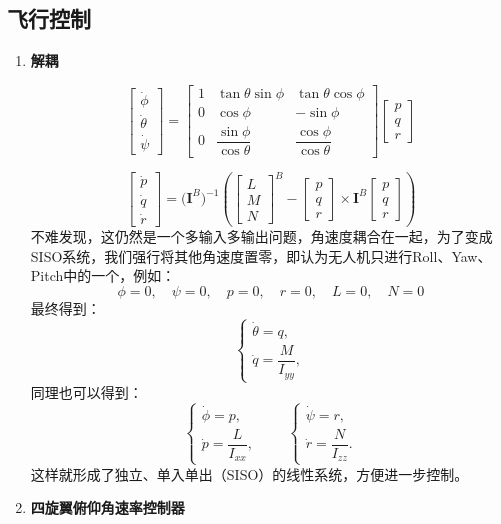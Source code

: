 \documentclass[../main.tex]{subfiles}
\begin{document}
\subsection{飞行控制}
\begin{enumerate}
    \item \textbf{解耦}

$$
\begin{bmatrix}\dot{\phi}\\[4pt]\dot{\theta}\\[4pt]\dot{\psi}\end{bmatrix}
=
\begin{bmatrix}
1 & \tan\theta\sin\phi & \tan\theta\cos\phi\\[6pt]
0 & \cos\phi & -\sin\phi\\[6pt]
0 & \dfrac{\sin\phi}{\cos\theta} & \dfrac{\cos\phi}{\cos\theta}
\end{bmatrix}
\begin{bmatrix}p\\[4pt]q\\[4pt]r\end{bmatrix}
$$

$$
\begin{bmatrix}\dot{p}\\[4pt]\dot{q}\\[4pt]\dot{r}\end{bmatrix}
=
\big(\mathbf{I}^B\big)^{-1}
\left(
\begin{bmatrix}L\\[4pt]M\\[4pt]N\end{bmatrix}^B
-
\begin{bmatrix}p\\[4pt]q\\[4pt]r\end{bmatrix}
\times
\mathbf{I}^B
\begin{bmatrix}p\\[4pt]q\\[4pt]r\end{bmatrix}
\right)
$$
不难发现，这仍然是一个多输入多输出问题，角速度耦合在一起，为了变成SISO系统，我们强行将其他角速度置零，即认为无人机只进行Roll、Yaw、Pitch中的一个，例如：
$$
\phi=0,\quad \psi=0,\quad p=0,\quad r=0,\quad L=0,\quad N=0
$$
最终得到：
$$
\begin{cases}
\dot{\theta}=q,\\[6pt]
\dot{q}=\dfrac{M}{I_{yy}},
\end{cases}
$$
同理也可以得到：
$$
\begin{cases}
\dot{\phi}=p,\\[6pt]
\dot{p}=\dfrac{L}{I_{xx}},
\end{cases}
\qquad
\begin{cases}
\dot{\psi}=r,\\[6pt]
\dot{r}=\dfrac{N}{I_{zz}}.
\end{cases}
$$
这样就形成了独立、单入单出（SISO）的线性系统，方便进一步控制。
\item \textbf{四旋翼俯仰角速率控制器}\\


\end{enumerate}
\end{document}
